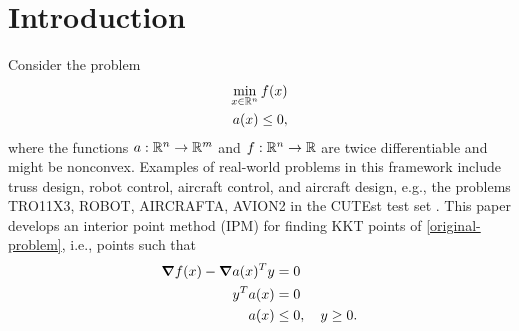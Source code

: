 \documentclass{article}
\begin{document}
\section{Introduction}


Consider the problem
\begin{subequations}\label{original-problem} 
\begin{flalign}
\min_{x \in \mathbb{R}^{n}}{f(x)} \\
a(x) \le 0,
\end{flalign}
\end{subequations}
where the functions $a : \mathbb{R}^{n} \rightarrow \mathbb{R}^{m}$ and $f : \mathbb{R}^{n} \rightarrow \mathbb{R}$ are twice differentiable and might be nonconvex. Examples of real-world problems in this framework include truss design, robot control, aircraft control, and aircraft design, e.g., the problems TRO11X3, ROBOT, AIRCRAFTA, AVION2 in the CUTEst test set \cite{gould2015cutest}. This paper develops an interior point method (IPM) for finding KKT points of \eqref{original-problem}, i.e., points such that
\begin{subequations}\label{kkt-of-original-problem} 
\begin{flalign}
\grad f(x) - \grad a(x)^T y &= 0 \\
y^T a(x) &= 0 \\
a(x) &\le 0, \quad y \ge 0.
\end{flalign}
\end{subequations}
\end{document}
